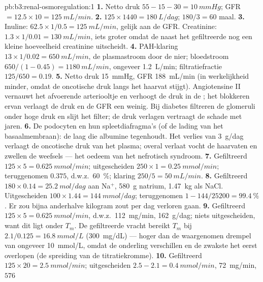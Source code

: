 \begin{solution}{pb:b3:renal-osmoregulation:1}
\textbf{1.} Netto druk $55 - 15 - 30 = \qty{10}{mmHg}$; GFR $= 12.5
\times 10 = \qty{125}{mL/min}$.
\textbf{2.} $125\times 1440 = \qty{180}{L/dag}$; $180/3 = 60$ maal.
\textbf{3.} Inuline: $62.5\times 1/0.5 = \qty{125}{mL/min}$, gelijk aan
de GFR. Creatinine: $1.3\times 1/0.01 = \qty{130}{mL/min}$, iets
groter omdat de  naast het gefiltreerde nog een
kleine hoeveelheid creatinine uitscheidt.
\textbf{4.} PAH-klaring $13\times 1/0.02 = \qty{650}{mL/min}$, de
plasmastroom door de nier; bloedstroom $650/(1 - 0.45) = \qty{1180}{mL/min}$,
ongeveer \qty{1.2}{L/min}; filtratiefractie $125/650 = 0.19$.
\textbf{5.} Netto druk \qty{15}{mmHg}, GFR \qty{188}{mL/min} (in
werkelijkheid minder, omdat de oncotische druk langs het haarvat
stijgt). Angiotensine II vernauwt het afvoerende arteriooltje en
verhoogt de druk in de ; het blokkeren ervan verlaagt de druk
en de GFR een weinig. Bij diabetes filtreren de glomeruli onder hoge
druk en slijt het filter; de druk verlagen vertraagt de schade met
jaren.
\textbf{6.} De podocyten en hun spleetdiafragma's (of de lading van het
basaalmembraan): de laag die albumine tegenhoudt. Het verlies van
\qty{3}{g/dag} verlaagt de oncotische druk van het plasma; overal
verlaat vocht de haarvaten en zwellen de weefsels --- het oedeem van
het nefrotisch syndroom.
\textbf{7.} Gefiltreerd $125\times 5 = \qty{0.625}{mmol/min}$;
uitgescheiden $250\times 1 = \qty{0.25}{mmol/min}$; teruggenomen
$0.375$, d.w.z.\ \qty{60}{\%}; klaring $250/5 = \qty{50}{mL/min}$.
\textbf{8.} Gefiltreerd $180\times 0.14 = \qty{25.2}{mol/dag}$ aan Na$^{+}$,
\qty{580}{g} natrium, \qty{1.47}{kg} als NaCl. Uitgescheiden $100\times 1.44
= \qty{144}{mmol/dag}$; teruggenomen $1 - 144/\num{25200} = \qty{99.4}{\%}$.
Er zou bijna anderhalve kilogram zout per dag verloren gaan.
\textbf{9.} Gefiltreerd $125\times 5 = \qty{0.625}{mmol/min}$, d.w.z.\
\qty{112}{mg/min}, \qty{162}{g/dag}; niets uitgescheiden, want dit ligt
onder $T_{m}$. De gefiltreerde vracht bereikt $T_{m}$ bij $2.1/0.125 =
\qty{16.8}{mmol/L}$ (\qty{300}{mg/dL}) --- hoger dan de waargenomen
drempel van ongeveer \qty{10}{mmol/L}, omdat de  onderling
verschillen en de zwakste het eerst overlopen (de spreiding van de
titratiekromme).
\textbf{10.} Gefiltreerd $125\times 20 = \qty{2.5}{mmol/min}$;
uitgescheiden $2.5 - 2.1 = \qty{0.4}{mmol/min}$, \qty{72}{mg/min}, $576$

\end{solution}
